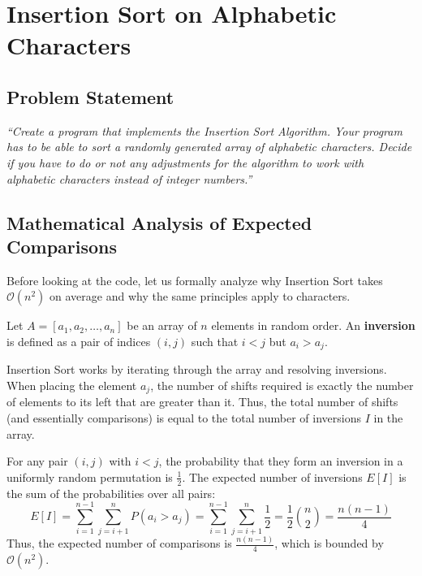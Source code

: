 \documentclass[12pt,a4paper]{article}
\theoremstyle{plain}
\theoremstyle{definition}
\theoremstyle{remark}
\newcommand{\bigO}[1]{\ensuremath{\mathcal{O}(#1)}}
\begin{document}
\section{Insertion Sort on Alphabetic Characters}

\subsection{Problem Statement}

\begin{infobox}
\textit{``Create a program that implements the Insertion Sort Algorithm.
Your program has to be able to sort a randomly generated array of alphabetic
characters.  Decide if you have to do or not any adjustments for the algorithm
to work with alphabetic characters instead of integer numbers.''}
\end{infobox}

\subsection{Mathematical Analysis of Expected Comparisons}

Before looking at the code, let us formally analyze why Insertion Sort takes $\bigO{n^2}$ on average and why the same principles apply to characters.

Let $A = [a_1, a_2, \ldots, a_n]$ be an array of $n$ elements in random order. An \textbf{inversion} is defined as a pair of indices $(i, j)$ such that $i < j$ but $a_i > a_j$.

Insertion Sort works by iterating through the array and resolving inversions. When placing the element $a_j$, the number of shifts required is exactly the number of elements to its left that are greater than it. Thus, the total number of shifts (and essentially comparisons) is equal to the total number of inversions $I$ in the array.

For any pair $(i, j)$ with $i < j$, the probability that they form an inversion in a uniformly random permutation is $\frac{1}{2}$. The expected number of inversions $E[I]$ is the sum of the probabilities over all pairs:
\[
  E[I] = \sum_{i=1}^{n-1} \sum_{j=i+1}^n P(a_i > a_j) = \sum_{i=1}^{n-1} \sum_{j=i+1}^n \frac{1}{2} = \frac{1}{2} \binom{n}{2} = \frac{n(n-1)}{4}
\]
Thus, the expected number of comparisons is $\frac{n(n-1)}{4}$, which is bounded by $\bigO{n^2}$.
\end{document}

